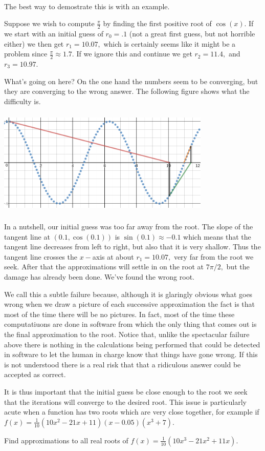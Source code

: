 \\
The best way to demostrate this is with an example.
\begin{myexample}
  Suppose we wish to compute $\frac{\pi}{2}$ by finding the first
  positive root of $\cos(x).$ If we start with an initial guess of
  $r_0=.1$ (not a great first guess, but not horrible either) we then
  get $r_1=10.07,$ which is certainly seems like it might be  a
  problem since $\frac{\pi}{2}\approx 1.7.$ If we ignore this and
  continue we get $r_2= 11.4,$ and $r_3=10.97.$

  What's going on here? On the one hand the numbers seem to be
  converging, but they are converging to the wrong answer. The
  following figure shows what the difficulty is. 
  \centerline{\includegraphics*[height=2in,width=4in]{Figures/NewtonsMethodFail1}}
  In a nutshell, our initial guess was too far away from the
  root. The slope of the tangent line at $(0.1, \cos(0.1))$ is
  $\sin(0.1)\approx -0.1$ which means that the tangent line decreases
  from left to right, but also that it is very shallow. Thus the
  tangent line crosses the $x-$axis at about $r_1=10.07,$ very far from
  the root we seek. After that the approximations will settle in on
  the root at $7\pi/2,$  but the damage has already been done. We've
  found the wrong root.

  We call this a subtle failure because, although it is glaringly
  obvious what goes wrong when we draw a picture of each
  successive approximation the fact is that most of the time
  there will be no pictures. In fact, most of the time these
  computatiuons are done in software from which the only thing that
  comes out is the final approximation to the root. Notice that,
  unlike the spectacular failure above there is nothing in the
  calculations being performed that could be detected in software to
  let the human in charge know that things have gone wrong. If this is
  not understood there is a real risk that that a ridiculous answer
  could be accepted as correct.
\end{myexample}
It is thus important that the initial guess be close enough to the
root we seek that the iterations will converge to the desired root.
This issue is particularly acute when a function has two roots which
are very close together, for example if
$f(x) =
\frac{1}{10}(10x^2-21x+11)(x-0.05)(x^3+7).$%
\begin{embeddedproblem}{}
  Find approximations to all real roots of $f(x) =
  \frac{1}{10}(10x^3-21x^2+11x).$
\end{embeddedproblem}


